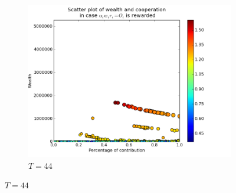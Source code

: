 \documentclass{article}
\begin{document}
\begin{figure}[h]
\begin{subfigure}[t]{0.333\textwidth}
\includegraphics[width=\textwidth]{nq_output_scatter/scatter_ranking_1_044.png}
\caption{$T = 44$}
\end{subfigure}%

\bigskip



\end{figure}
\end{document}
